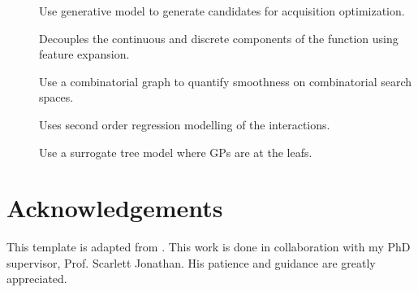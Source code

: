 \documentclass[
    american,a4paper
    ]{scrartcl}
\begin{document}
        \begin{description}
            \item[\cite{pmlr-v124-swersky20a}] Use generative model to generate candidates for acquisition optimization.
            \item[\cite{daxberger2019mixed}] Decouples the continuous and discrete components of the function using feature expansion.
            \item[\cite{oh2019combinatorial}] Use a combinatorial graph to quantify smoothness on combinatorial search spaces.
            \item[\cite{baptista2018bayesian}] Uses second order regression modelling of the interactions.
            \item[\cite{pmlr-v70-jenatton17a}] Use a surrogate tree model where GPs are at the leafs.
        \end{description}
      \newpage
      \section*{Acknowledgements}
      This template is adapted from \cite{Stefan2018}.
      This work is done in collaboration with my PhD supervisor, Prof. Scarlett Jonathan. 
      His patience and guidance are greatly appreciated.
      \printbibliography
    
\end{document}
